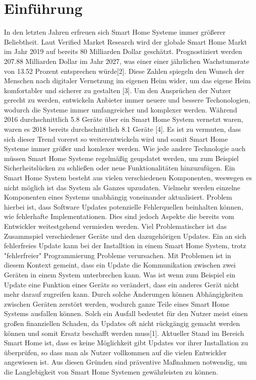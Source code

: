 \chapter{Einführung}

In den letzten Jahren erfreuen sich Smart Home Systeme immer größerer Beliebtheit. Laut Verified Market Research wird
der globale Smart Home Markt im Jahr 2019 auf bereits 80 Milliarden Dollar geschätzt. Prognostiziert werden 207.88 
Milliarden Dollar im Jahr 2027, was einer einer jährlichen Wachstumsrate von 13.52 Prozent entsprechen würde[2].
Diese Zahlen spiegeln den Wunsch der Menschen nach digitaler Vernetzung im eigenen Heim wider, um das eigene Heim
komfortabler und sicherer zu gestalten [3].
Um den Ansprüchen der Nutzer gerecht zu werden, entwickeln Anbieter immer neuere und bessere Techonologien,
wodurch die Systeme immer umfangreicher und komplexer werden. Während 2016
durchschnittlich 5.8 Geräte über ein Smart Home System vernetzt waren, waren es 2018  bereits durchschnittlich 8.1 Geräte [4]. 
Es ist zu vermuten, dass sich dieser Trend vorerst so weiterentwickeln wird und somit Smart Home Systeme immer
größer und komlexer werden.
Wie jede andere Technologie auch müssen Smart Home Systeme regelmäßig geupdatet werden, um zum Beispiel
Sicherheitslücken zu schließen oder neue Funktionalitäten hinzuzufügen. Ein Smart Home System besteht aus vielen verschiedenen
Komponenten, weswegen es nicht möglich ist das System als Ganzes upzudaten. Vielmehr werden einzelne Komponenten eines Systems
unabhängig voneinander aktualisiert. Problem hierbei ist, dass Software Updates potenzielle Fehlerquellen beinhalten können, wie
fehlerhafte Implementationen. Dies sind jedoch Aspekte die bereits vom Entwickler weitestgehend vermieden werden.
Viel Problematischer ist das Zusammspiel verschiedener Geräte und den dazugehörigen Updates. Ein an sich fehlerfreies Update
kann bei der Installtion in einem Smart Home System, trotz "fehlerfreier" Programmierung Probleme verursachen. Mit Problemen
ist in diesem Kontext gemeint, dass ein Update die Kommunikation zwischen zwei Geräten in einem System unterbrechen kann.
Was ist wenn zum Beispiel 
ein Update eine Funktion eines Geräts so verändert, dass ein anderes Gerät nicht mehr darauf zugreifen kann. Durch solche Änderungen
können Abhängigkeiten zwischen Geräten zerstört werden, wodurch ganze Teile eines Smart Home Systems ausfallen
können. Solch ein Ausfall bedeutet für den Nutzer meist einen großen finanziellen Schaden, da Updates oft nicht 
rückgängig gemacht werden können und somit Ersatz beschafft werden muss[1].
Aktueller Stand im Bereich Smart Home ist, dass es keine Möglichkeit gibt Updates vor ihrer Installation zu überprüfen, so dass man
als Nutzer vollkommen auf die vielen Entwickler angewiesen ist. 
Aus diesen Gründen sind präventive Maßnahmen notwendig,  um die Langlebigkeit von Smart Home Systemen gewährleisten zu können.



